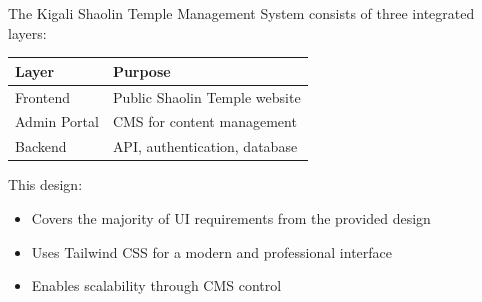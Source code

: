 \documentclass[12pt,a4paper]{article}
\begin{document}
The Kigali Shaolin Temple Management System consists of three integrated layers:

\begin{center}
\begin{tabular}{ll}
\toprule
Layer & Purpose \\
\midrule
Frontend & Public Shaolin Temple website \\
Admin Portal & CMS for content management \\
Backend & API, authentication, database \\
\bottomrule
\end{tabular}
\end{center}

This design:
\begin{itemize}
    \item Covers the majority of UI requirements from the provided design
    \item Uses Tailwind CSS for a modern and professional interface
    \item Enables scalability through CMS control
\end{itemize}
\end{document}
